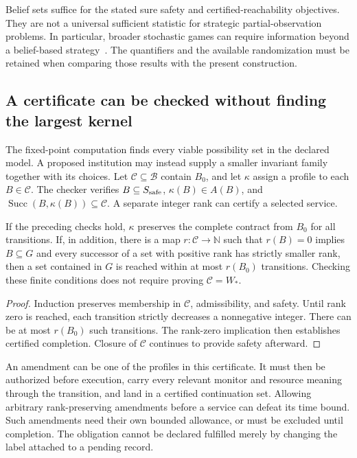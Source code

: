 Belief sets suffice for the stated sure safety and certified-reachability objectives. They are not a universal sufficient statistic for strategic partial-observation problems. In particular, broader stochastic games can require information beyond a belief-based strategy~\cite{MS:belieffails}. The quantifiers and the available randomization must be retained when comparing those results with the present construction.

\subsection{A certificate can be checked without finding the largest kernel}
The fixed-point computation finds every viable possibility set in the declared model. A proposed institution may instead supply a smaller invariant family together with its choices. Let $\mathcal C\subseteq\mathcal B$ contain $B_0$, and let $\kappa$ assign a profile to each $B\in\mathcal C$. The checker verifies $B\subseteq S_{\rm safe}$, $\kappa(B)\in A(B)$, and $\operatorname{Succ}(B,\kappa(B))\subseteq\mathcal C$. A separate integer rank can certify a selected service.

\begin{MSproposition}\label{MS:prop:continuation-certificate}
If the preceding checks hold, $\kappa$ preserves the complete contract from $B_0$ for all transitions. If, in addition, there is a map $r:\mathcal C\to\mathbb N$ such that $r(B)=0$ implies $B\subseteq G$ and every successor of a set with positive rank has strictly smaller rank, then a set contained in $G$ is reached within at most $r(B_0)$ transitions. Checking these finite conditions does not require proving $\mathcal C=W_*$.
\end{MSproposition}
\begin{proof}
Induction preserves membership in $\mathcal C$, admissibility, and safety. Until rank zero is reached, each transition strictly decreases a nonnegative integer. There can be at most $r(B_0)$ such transitions. The rank-zero implication then establishes certified completion. Closure of $\mathcal C$ continues to provide safety afterward.
\end{proof}

An amendment can be one of the profiles in this certificate. It must then be authorized before execution, carry every relevant monitor and resource meaning through the transition, and land in a certified continuation set. Allowing arbitrary rank-preserving amendments before a service can defeat its time bound. Such amendments need their own bounded allowance, or must be excluded until completion. The obligation cannot be declared fulfilled merely by changing the label attached to a pending record.

